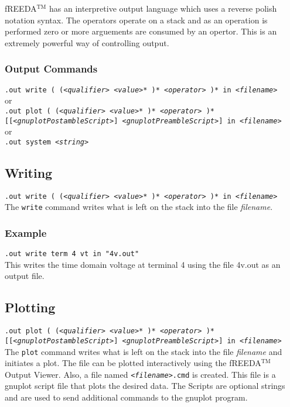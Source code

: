 fREEDA$^{\mathrm{TM}}$ has an interpretive output language which uses a reverse
polish notation syntax.  The operators operate on a stack and as an
operation is performed zero or more arguements are consumed by an
opertor.  This is an extremely powerful way of controlling output.

\subsubsection{Output Commands}

{\tt .out write
( (<{\it qualifier}> <{\it value}>* )* <{\it operator}> )*
      in <{\it filename}>} \medskip
\\
or \medskip
\\
{\tt .out plot
( (<{\it qualifier}> <{\it value}>* )* <{\it operator}> )*
[[<{\it gnuplotPostambleScript}>] <{\it gnuplotPreambleScript}>]
in <{\it filename}>} \medskip
\\
or \medskip
\\
{\tt .out system <{\it string}>}

\subsection{Writing}

{\tt .out write
( (<{\it qualifier}> <{\it value}>* )* <{\it operator}> )*
      in <{\it filename}>} \medskip
\\
The {\tt write} command writes what is left on the stack into the file
{\it filename}.

\subsubsection{Example}

{\tt .out write term 4 vt in "4v.out"} \medskip
\\
This writes the time domain voltage at terminal 4 using the file
4v.out as an output file.

\subsection{Plotting}

{\tt .out plot
( (<{\it qualifier}> <{\it value}>* )* <{\it operator}> )*
[[<{\it gnuplotPostambleScript}>] <{\it gnuplotPreambleScript}>]
in <{\it filename}>} \medskip
\\
The {\tt plot} command writes what is left on the stack into the file
{\it filename} and initiates a plot. The file can be plotted
interactively using the fREEDA$^{\mathrm{TM}}$ Output Viewer. Also, a file named
{\tt<{\it filename}>.cmd} is created. This file is a gnuplot
\cite{gnuplot} script file that plots the desired data. The Scripts
are optional strings and are used to send additional commands to the
gnuplot program.

